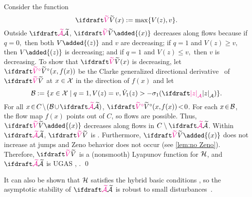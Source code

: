 \proofsketch
Consider the function 
\begin{equation}
    \tV(x) := \max\{V(z), v\}.
\end{equation} 
Outside $\calAX$, $\tV\added{(x)}$ 
decreases along flows because
if $q = 0,$ then both $V\added{(z)}$ and $v$ are decreasing; 
if $q = 1$ and $V(z) \geq v,$ 
then $V\added{(z)}$ is decreasing; and if $q = 1$ and $V(z) \leq v,$ 
then $v$ is decreasing.
    To show that $\tV(x)$ is decreasing, let $\tVc(x, f(x))$ be 
    the Clarke generalized directional derivative~\cite{clarke_optimization_1990}
    of $\tV$ at $x \in {\mathcal{X}}$ in the direction of $f(x)$
    and let 
        $$\calB := \{{x \in \calX} \mid {q=1}, 
                V(z) = v \AND \dot V_1(z) > -\sigma_1(\distA{z})\}.$$
    For all $\squeezespaces{0.5} x \in C \setminus (\calB \union \calAX)$, 
    $\squeezespaces{0.5} \tVc(x, f(x)) < 0$.
    For each $\squeezespaces{0.5}x \in \calB$, the flow map $f(x)$ points out of $C$, 
    so flows are possible.
    Thus, $\tV\added{(x)}$ decreases along flows in $C \setminus \calAX$.
    Within $\calAX$, $\tV$ is . 
    Furthermore, $\tV\added{(x)}$ does not increase at jumps
    and Zeno behavior does not occur (see \cref{lem:no Zeno}).
    Therefore, $\tV$ is a (nonsmooth) Lyapunov function for ${\mathcal{H}}$, and
    $\calAX$ is UGAS
    \cite[Theorem 7.8]{sanfelice_invariance_2007}, 
    \cite[Theorem 3.22]{sanfelice_hybrid_2021}.
    \qed\par
    It can also be shown that ${\mathcal{H}}$ satisfies 
    the hybrid basic conditions \cite[Definition 2.18]{sanfelice_hybrid_2021}, 
    so the asymptotic stability of $\calAX$ is 
    robust to small
    disturbances~\cite[Theorem 3.26]{sanfelice_hybrid_2021}.


